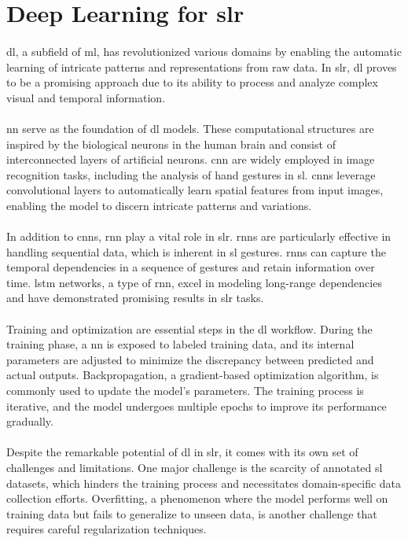 \section{Deep Learning for \ac{slr}}
\paragraph{}
\ac{dl}, a subfield of \ac{ml}, has revolutionized various domains by enabling the automatic learning of intricate patterns and representations from raw data. In \ac{slr}, \ac{dl} proves to be a promising approach due to its ability to process and analyze complex visual and temporal information.
\paragraph{}
\ac{nn} serve as the foundation of \ac{dl} models. These computational structures are inspired by the biological neurons in the human brain and consist of interconnected layers of artificial neurons. \ac{cnn} are widely employed in image recognition tasks, including the analysis of hand gestures in \ac{sl}. \ac{cnn}s leverage convolutional layers to automatically learn spatial features from input images, enabling the model to discern intricate patterns and variations.
\paragraph{}
In addition to \ac{cnn}s, \ac{rnn} play a vital role in \ac{slr}. \ac{rnn}s are particularly effective in handling sequential data, which is inherent in \ac{sl} gestures. \ac{rnn}s can capture the temporal dependencies in a sequence of gestures and retain information over time. \ac{lstm} networks, a type of \ac{rnn}, excel in modeling long-range dependencies and have demonstrated promising results in \ac{slr} tasks.
\paragraph{}
Training and optimization are essential steps in the \ac{dl} workflow. During the training phase, a \ac{nn} is exposed to labeled training data, and its internal parameters are adjusted to minimize the discrepancy between predicted and actual outputs. Backpropagation, a gradient-based optimization algorithm, is commonly used to update the model's parameters. The training process is iterative, and the model undergoes multiple epochs to improve its performance gradually.
\paragraph{}
Despite the remarkable potential of \ac{dl} in \ac{slr}, it comes with its own set of challenges and limitations. One major challenge is the scarcity of annotated \ac{sl} datasets, which hinders the training process and necessitates domain-specific data collection efforts. Overfitting, a phenomenon where the model performs well on training data but fails to generalize to unseen data, is another challenge that requires careful regularization techniques.
